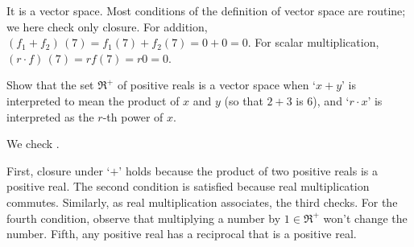 \begin{exercises}
\begin{answer}
      It is a vector space.
      Most conditions of the definition of vector space are routine; we here
      check only closure.
      For addition,
      \( (f_1+f_2)\,(7)=f_1(7)+f_2(7)=0+0=0 \).
      For scalar multiplication,
      \( (r\cdot f)\,(7)=rf(7)=r0=0 \).  
    \end{answer}
  \recommended \item
    Show that the set \( \Re^+ \) of positive reals
    is a vector space when `\( x+y \)' is interpreted to mean
    the product of \( x \) and \( y \) (so that \( 2+3 \) is \( 6 \)),
    and `\( r\cdot x \)' is interpreted as the \( r \)-th power of \( x \).
    \begin{answer}
      We check .

      First, closure under `\( + \)'
      holds because the product of two positive reals is
      a positive real.
      The second condition is satisfied because real multiplication commutes.
      Similarly, as real multiplication associates, the third checks.
      For the fourth condition, observe that multiplying a number by
      \( 1\in\Re^+ \) won't change the number.
      Fifth, any positive real has a reciprocal that is a positive real.


\end{answer}
\end{exercises}
